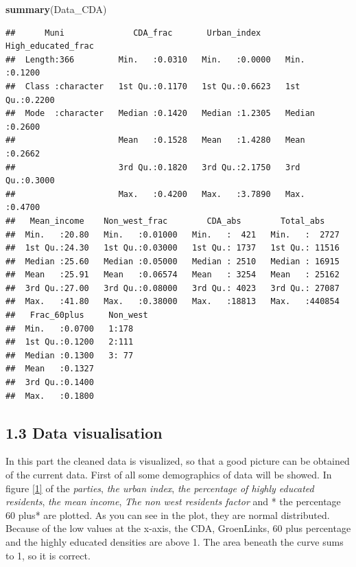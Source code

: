 \documentclass[11pt,]{article}
\newenvironment{Shaded}{\begin{snugshade}}{\end{snugshade}}
\newcommand{\KeywordTok}[1]{\textcolor[rgb]{0.13,0.29,0.53}{\textbf{#1}}}
\newcommand{\NormalTok}[1]{#1}
\begin{document}
\begin{Shaded}
\begin{Highlighting}[]
\KeywordTok{summary}\NormalTok{(Data_CDA)}
\end{Highlighting}
\end{Shaded}

\begin{verbatim}
##      Muni              CDA_frac       Urban_index     High_educated_frac
##  Length:366         Min.   :0.0310   Min.   :0.0000   Min.   :0.1200    
##  Class :character   1st Qu.:0.1170   1st Qu.:0.6623   1st Qu.:0.2200    
##  Mode  :character   Median :0.1420   Median :1.2305   Median :0.2600    
##                     Mean   :0.1528   Mean   :1.4280   Mean   :0.2662    
##                     3rd Qu.:0.1820   3rd Qu.:2.1750   3rd Qu.:0.3000    
##                     Max.   :0.4200   Max.   :3.7890   Max.   :0.4700    
##   Mean_income    Non_west_frac        CDA_abs        Total_abs     
##  Min.   :20.80   Min.   :0.01000   Min.   :  421   Min.   :  2727  
##  1st Qu.:24.30   1st Qu.:0.03000   1st Qu.: 1737   1st Qu.: 11516  
##  Median :25.60   Median :0.05000   Median : 2510   Median : 16915  
##  Mean   :25.91   Mean   :0.06574   Mean   : 3254   Mean   : 25162  
##  3rd Qu.:27.00   3rd Qu.:0.08000   3rd Qu.: 4023   3rd Qu.: 27087  
##  Max.   :41.80   Max.   :0.38000   Max.   :18813   Max.   :440854  
##   Frac_60plus     Non_west
##  Min.   :0.0700   1:178   
##  1st Qu.:0.1200   2:111   
##  Median :0.1300   3: 77   
##  Mean   :0.1327           
##  3rd Qu.:0.1400           
##  Max.   :0.1800
\end{verbatim}

\subsection{1.3 Data visualisation}\label{data-visualisation}

In this part the cleaned data is visualized, so that a good picture can
be obtained of the current data. First of all some demographics of data
will be showed. In figure \ref{1} of the \emph{parties}, \emph{the urban
index}, \emph{the percentage of highly educated residents}, \emph{the
mean income}, \emph{The non west residents factor} and * the percentage
60 plus* are plotted. As you can see in the plot, they are normal
distributed. Because of the low values at the x-axis, the CDA,
GroenLinks, 60 plus percentage and the highly educated densities are
above 1. The area beneath the curve sums to 1, so it is correct.
\end{document}
